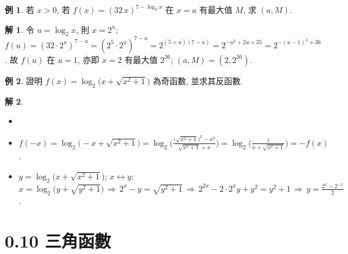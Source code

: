 \documentclass[12pt]{extarticle}
\newcommand{\ds}{\displaystyle}
\newcommand{\ie}{\,\Longrightarrow\,}
\theoremstyle{definition}
\newtheorem*{ex}{例}
\newtheorem*{sol}{解}
\begin{document}
\begin{ex}
  若 $x > 0$, 若 $\ds f(x) = (32\,x)^{7 - \log_2 x}$ 在 $x = a$ 有最大值 $M$, 求 $(a, M)$. 
\end{ex}

\begin{sol}
  令 $u = \log_2x$, 則 $x = 2^u$; $f(u) = (32\cdot 2^u)^{7 - u} = (2^5\cdot 2^u)^{7 - u} = 2^{(5 + u)(7 - u)} = 2^{-u^2 + 2u + 35} = 2^{-(u - 1)^2 + 36}$. 故 $f(u)$ 在 $u = 1$, 亦即 $x = 2$ 有最大值 $2^{36}$; $(a, M) = (2, 2^{36})$.
\end{sol}

\begin{ex}
  證明 $\ds f(x) = \log_2\big(x + \sqrt{x^2 + 1}\big)$ 為奇函數, 並求其反函數. 
\end{ex}

\begin{sol}
  \vspace{-0.5em}
  \begin{itemize}\setlength\itemsep{0em}
    \item[]
    \item $\ds f(-x) = \log_2\big(-x + \sqrt{x^2 + 1}\big) = \log_2\bigg(\frac{\big(\sqrt{x^2 + 1}\big)^2 - x^2}{\sqrt{x^2 + 1} + x}\bigg) = \log_2\bigg(\frac{1}{x + \sqrt{x^2 + 1}}\bigg) = -f(x)$. 
    \item $\ds y = \log_2\big(x + \sqrt{x^2 + 1}\big)$; $x\longleftrightarrow y$: $\ds x = \log_2\big(y + \sqrt{y^2 + 1}\big)\ie 2^x - y = \sqrt{y^2 + 1} \ie 2^{2x} - 2\cdot2^x y + y^2 = y^2 + 1 \ie y = \frac{2^x - 2^{-x}}{2}$. 
  \end{itemize}
\end{sol}

\section*{0.10 三角函數}
\end{document}
